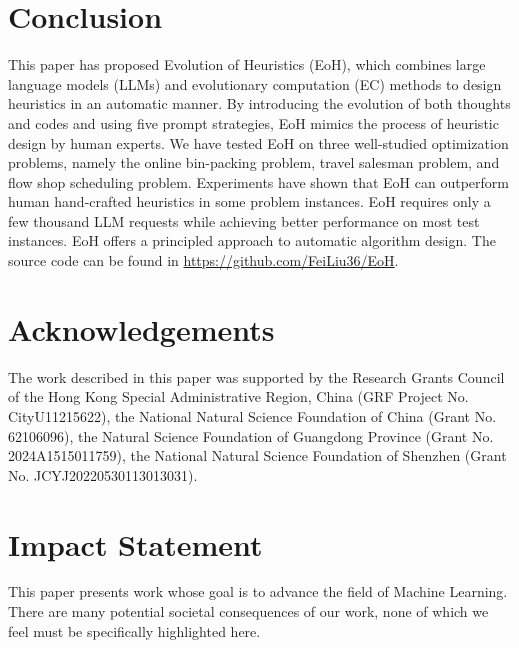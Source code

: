 \section{Conclusion}\label{sec:conclusion}

This paper has proposed Evolution of Heuristics (EoH), which combines large language models (LLMs) and evolutionary computation (EC) methods to design heuristics in an automatic manner. By introducing the evolution of both thoughts and codes and using five prompt strategies, EoH mimics the process of heuristic design by human experts. We have tested EoH on three well-studied optimization problems, namely the online bin-packing problem, travel salesman problem, and flow shop scheduling problem. Experiments have shown that EoH can outperform human hand-crafted heuristics in some problem instances. EoH requires only a few thousand LLM requests while achieving better performance on most test instances. EoH offers a principled approach to automatic algorithm design. The source code can be found in \url{https://github.com/FeiLiu36/EoH}.


\newpage
\section*{Acknowledgements}
The work described in this paper was supported by the Research Grants Council of the Hong Kong Special Administrative Region, China (GRF Project No. CityU11215622), the National Natural Science Foundation of China (Grant No. 62106096), the Natural Science Foundation of Guangdong Province (Grant No. 2024A1515011759), the National Natural Science Foundation of Shenzhen (Grant No. JCYJ20220530113013031).


\section*{Impact Statement}

This paper presents work whose goal is to advance the field of Machine Learning. There are many potential societal consequences of our work, none of which we feel must be specifically highlighted here.

\vspace{1pt}